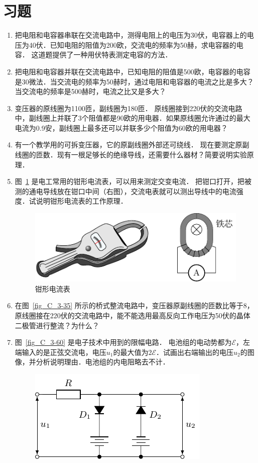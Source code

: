\section*{习题}
\begin{enumerate}
    \item 把电阻和电容器串联在交流电路中，测得电阻上的电压为30伏，电容器上的电压为40伏．已知电阻的阻值为200欧，交流电的频率为50赫，求电容器的电容．
    这道题提供了一种用伏特表测定电容的方法．
    \item 把电阻和电容器并联在交流电路中，已知电阻的阻值是500欧，电容器的电容是30微法．当交流电的频率为50赫时，通过电阻和电容器的电流之比是多大？当交流电的频率是500赫时，电流之比又是多大？
    \item 变压器的原线圈为1100匝，副线圈为180匝．
    原线圈接到220伏的交流电路中，副线圈上并联了3个阻值都是90欧的用电器．如果原线圈允许通过的最大电流为0.9安，副线圈上最多还可以并联多少个阻值为60欧的用电器？
    \item 有一个教学用的可拆变压器，它的原副线圈外部还可绕线．
    现在要测定原副线圈的匝数．现有一根足够长的绝缘导线，还需要什么器材？简要说明实验原理．
    \item 图~\ref{fig_C_3-59} 是电工常用的钳形电流表，可以用来测定交变电流．
    把钳口打开，把被测的通电导线放在钳口中间（右图），交流电表就可以测出导线中的电流强度．试说明钳形电流表的工作原理．
    \begin{figure}[htbp]
        \centering
        \includegraphics{fig/C/3-59.pdf}
        \caption{钳形电流表}\label{fig_C_3-59}
    \end{figure}
    \item 在图~\ref{fig_C_3-35} 所示的桥式整流电路中，变压器原副线圈的匝数比等于8，原线圈接在220伏的交流电路中，能不能选用最高反向工作电压为50伏的晶体二极管进行整流？为什么？
    \item 图~\ref{fig_C_3-60} 是电子技术中用到的限幅电路．
    电池组的电动势都为$\mathcal{E}$，左端输入的是正弦交流电，电压$u_1$的最大值为$2\mathcal{E}$．试画出右端输出的电压$u_2$的图像，并分析说明理由．电池组的内电阻略去不计．
    \begin{figure}[htbp]
        \centering
        \includegraphics{fig/C/3-60.pdf}

\end{figure}
\end{enumerate}
